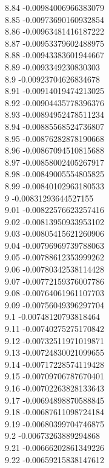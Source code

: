 {8.84	-0.00984006966383079\\
8.85	-0.00973690160932854\\
8.86	-0.00963481416187222\\
8.87	-0.00953379602488975\\
8.88	-0.00943383601944667\\
8.89	-0.0093349230830303\\
8.9	-0.00923704626834678\\
8.91	-0.00914019474213025\\
8.92	-0.00904435778396376\\
8.93	-0.00894952478511234\\
8.94	-0.00885568524736807\\
8.95	-0.00876282878190668\\
8.96	-0.00867094510815688\\
8.97	-0.00858002405267917\\
8.98	-0.00849005554805825\\
8.99	-0.00840102963180533\\
9	-0.00831293644527155\\
9.01	-0.00822576623257416\\
9.02	-0.00813950933953102\\
9.03	-0.00805415621260906\\
9.04	-0.00796969739788063\\
9.05	-0.00788612353999262\\
9.06	-0.00780342538114428\\
9.07	-0.00772159376007786\\
9.08	-0.00764061961107703\\
9.09	-0.00756049396297704\\
9.1	-0.00748120793818464\\
9.11	-0.00740275275170842\\
9.12	-0.00732511971019871\\
9.13	-0.00724830021099655\\
9.14	-0.00717228574119428\\
9.15	-0.00709706787670401\\
9.16	-0.00702263828133643\\
9.17	-0.00694898870588845\\
9.18	-0.00687611098724184\\
9.19	-0.00680399704746875\\
9.2	-0.00673263889294868\\
9.21	-0.00666202861349226\\
9.22	-0.00659215838147612\\
}
